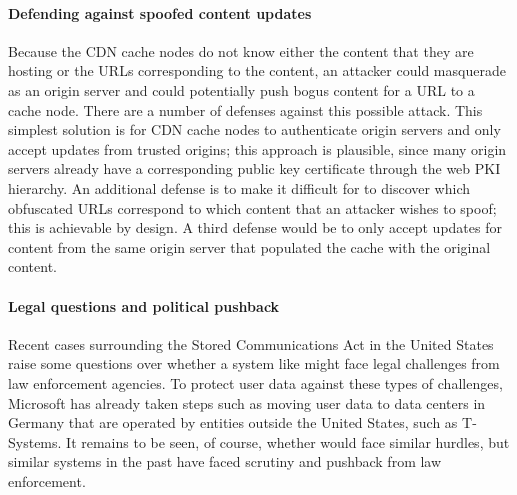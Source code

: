 \paragraph{Defending against spoofed content updates} Because the CDN cache
nodes do not know either the content that they are hosting or the URLs
corresponding to the content, an attacker could masquerade as an origin server
and could potentially push bogus content for a URL to a cache node. There are
a number of defenses against this possible attack. This simplest solution is
for CDN cache nodes to authenticate origin servers and only accept updates
from trusted origins; this approach is plausible, since many origin servers already
have a corresponding public key certificate through the web PKI hierarchy.  An additional
defense is to make it difficult for to discover which obfuscated URLs correspond
to which content that an attacker wishes to spoof; this is achievable by design.
A third defense would be to only accept updates for content from the same origin
server that populated the cache with the original content.

\paragraph{Legal questions and political pushback} Recent cases surrounding
the Stored Communications Act in the United States raise some questions over
whether a system like \system{} might face legal challenges from law
enforcement agencies. To protect user data against these types of challenges,
Microsoft has already taken steps such as moving user data to data centers in
Germany that are operated by entities outside the United States, such as
T-Systems. It remains to be seen, of course, whether \system{} would face similar
hurdles, but similar systems in the past have faced scrutiny and pushback from law
enforcement.
